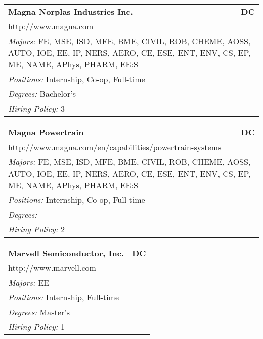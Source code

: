 \documentclass[twoside]{article}
\begin{document}
\begin{center}
\begin{multicols}{3}
\begin{FlushLeft}
\begin{minipage}{\columnwidth}\begin{tabularx}{.95\columnwidth}{Xr}
                 {\Large\bf Magna Norplas Industries Inc.} & {\Large\bf DC}\\
    \multicolumn{2}{p{.95\columnwidth}}{\url{http://www.magna.com}}\\
    \multicolumn{2}{p{.95\columnwidth}}{\emph{Majors:} FE, MSE, ISD, MFE, BME, CIVIL, ROB, CHEME, AOSS, AUTO, IOE, EE, IP, NERS, AERO, CE, ESE, ENT, ENV, CS, EP, ME, NAME, APhys, PHARM, EE:S}\\
    \multicolumn{2}{p{.95\columnwidth}}{\emph{Positions:} Internship, Co-op, Full-time}\\
    \multicolumn{2}{p{.95\columnwidth}}{\emph{Degrees:} Bachelor's}\\
    \multicolumn{2}{p{.95\columnwidth}}{\emph{Hiring Policy:} 3}\\
    \end{tabularx}
    
\end{minipage}
 
\begin{minipage}{\columnwidth}\begin{tabularx}{.95\columnwidth}{Xr}
                 {\Large\bf Magna Powertrain} & {\Large\bf DC}\\
    \multicolumn{2}{p{.95\columnwidth}}{\url{http://www.magna.com/en/capabilities/powertrain-systems}}\\
    \multicolumn{2}{p{.95\columnwidth}}{\emph{Majors:} FE, MSE, ISD, MFE, BME, CIVIL, ROB, CHEME, AOSS, AUTO, IOE, EE, IP, NERS, AERO, CE, ESE, ENT, ENV, CS, EP, ME, NAME, APhys, PHARM, EE:S}\\
    \multicolumn{2}{p{.95\columnwidth}}{\emph{Positions:} Internship, Co-op, Full-time}\\
    \multicolumn{2}{p{.95\columnwidth}}{\emph{Degrees:} }\\
    \multicolumn{2}{p{.95\columnwidth}}{\emph{Hiring Policy:} 2}\\
    \end{tabularx}
    
\end{minipage}
 
\begin{minipage}{\columnwidth}\begin{tabularx}{.95\columnwidth}{Xr}
                 {\Large\bf Marvell Semiconductor, Inc.} & {\Large\bf DC}\\
    \multicolumn{2}{p{.95\columnwidth}}{\url{http://www.marvell.com}}\\
    \multicolumn{2}{p{.95\columnwidth}}{\emph{Majors:} EE}\\
    \multicolumn{2}{p{.95\columnwidth}}{\emph{Positions:} Internship, Full-time}\\
    \multicolumn{2}{p{.95\columnwidth}}{\emph{Degrees:} Master's}\\
    \multicolumn{2}{p{.95\columnwidth}}{\emph{Hiring Policy:} 1}\\
    \end{tabularx}
    

\end{minipage}
\end{FlushLeft}
\end{multicols}
\end{center}
\end{document}
